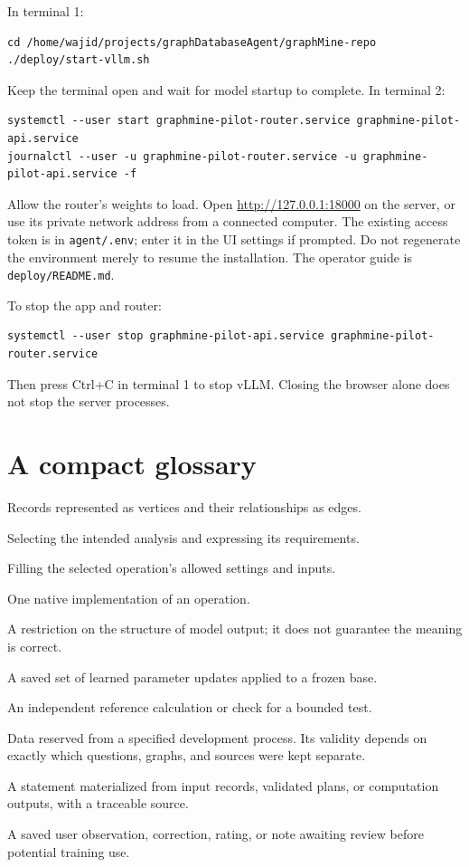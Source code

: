 \documentclass[11pt,a4paper]{article}
\newcommand{\code}[1]{\texttt{\detokenize{#1}}}
\newcommand{\pathref}[1]{\nolinkurl{#1}}
\begin{document}
In terminal 1:
\begin{lstlisting}
cd /home/wajid/projects/graphDatabaseAgent/graphMine-repo
./deploy/start-vllm.sh
\end{lstlisting}
Keep the terminal open and wait for model startup to complete. In terminal 2:
\begin{lstlisting}
systemctl --user start graphmine-pilot-router.service graphmine-pilot-api.service
journalctl --user -u graphmine-pilot-router.service -u graphmine-pilot-api.service -f
\end{lstlisting}
Allow the router's weights to load. Open \url{http://127.0.0.1:18000} on the
server, or use its private network address from a connected computer. The existing
access token is \code{GRAPHMINE_API_TOKEN} in \pathref{agent/.env}; enter it in
the UI settings if prompted. Do not regenerate the environment merely to resume
the installation. The operator guide is \pathref{deploy/README.md}.

To stop the app and router:
\begin{lstlisting}
systemctl --user stop graphmine-pilot-api.service graphmine-pilot-router.service
\end{lstlisting}
Then press Ctrl+C in terminal 1 to stop vLLM. Closing the browser alone does not
stop the server processes.

\section{A compact glossary}

\begin{description}[style=nextline,leftmargin=1.5em,labelindent=0pt]
\item[Graph] Records represented as vertices and their relationships as edges.
\item[Routing] Selecting the intended analysis and expressing its requirements.
\item[Planning] Filling the selected operation's allowed settings and inputs.
\item[Backend] One native implementation of an operation.
\item[Schema constraint] A restriction on the structure of model output; it does
not guarantee the meaning is correct.
\item[Adapter] A saved set of learned parameter updates applied to a frozen base.
\item[Oracle] An independent reference calculation or check for a bounded test.
\item[Holdout] Data reserved from a specified development process. Its validity
depends on exactly which questions, graphs, and sources were kept separate.
\item[Grounded fact] A statement materialized from input records, validated plans,
or computation outputs, with a traceable source.
\item[Annotation] A saved user observation, correction, rating, or note awaiting
review before potential training use.
\end{description}
\end{document}
